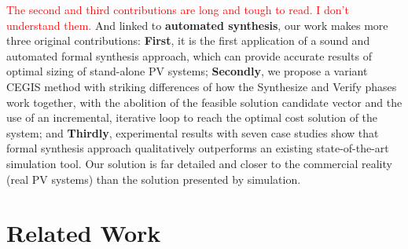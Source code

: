 \textcolor{red}{The second and third contributions are long and tough to read. I don't understand them.}
And linked to \textbf{automated synthesis}, our work makes more three original contributions: \textbf{First}, it is the first application of a sound and automated formal synthesis approach, which can provide accurate results of optimal sizing of stand-alone PV systems; 
\textbf{Secondly}, we propose a variant CEGIS method with striking differences of how the {\sc Synthesize} and {\sc Verify} phases work together, with the abolition of the feasible solution candidate vector and the use of an incremental, iterative loop to reach the optimal cost solution of the system; and 
\textbf{Thirdly}, experimental results with seven case studies show that formal synthesis approach qualitatively outperforms an existing state-of-the-art simulation tool. Our solution is far detailed and closer to the commercial reality (real PV systems) than the solution presented by simulation.

 
\section{Related Work}

